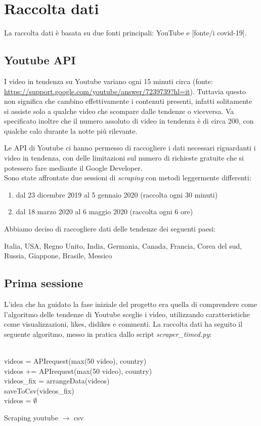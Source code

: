 \section*{Raccolta dati}
La raccolta dati è basata su due fonti principali: YouTube e [fonte/i covid-19].

\subsection*{Youtube API}
I video in tendenza su Youtube variano ogni 15 minuti circa (fonte: \url{https://support.google.com/youtube/answer/7239739?hl=it}). Tuttavia questo non significa che cambino effettivamente i contenuti presenti, infatti solitamente si assiste solo a qualche video che scompare dalle tendenze o viceversa. Va specificato inoltre che il numero assoluto di video in tendenza è di circa 200, con qualche calo durante la notte più rilevante.

Le API di Youtube ci hanno permesso di raccogliere i dati necessari riguardanti i video in tendenza, con delle limitazioni sul numero di richieste gratuite che si potessero fare mediante il Google Developer.
\\
Sono state affrontate due sessioni di \textit{scraping} con metodi leggermente differenti:
\begin{enumerate}
	\item dal 23 dicembre 2019 al 5 gennaio 2020 (raccolta ogni 30 minuti)
	\item dal 18 marzo 2020 al 6 maggio 2020 (raccolta ogni 6 ore)
\end{enumerate}
Abbiamo deciso di raccogliere dati delle tendenze dei seguenti paesi:

Italia, USA, Regno Unito, India, Germania, Canada, Francia, Corea del sud, Russia, Giappone, Brasile, Messico\\

\subsection*{Prima sessione}
L'idea che ha guidato la fase iniziale del progetto era quella di comprendere come l'algoritmo delle tendenze di Youtube sceglie i video, utilizzando caratteristiche come visualizzazioni, likes, dislikes e commenti. La raccolta dati ha seguito il seguente algoritmo, messo in pratica dallo script \textit{scraper\_timed.py}:\\
\\
\begin{algorithm}[H]
	\nl {} {
	\nl {}
	{
		\nl videos = APIrequest(max(50 video), country)\\
		\nl {}
		{
			\nl videos += APIrequest(max(50 video), country) \\
		}
		\nl videos\_fix = arrangeData(videos)\\ 
		\nl saveToCsv(videos\_fix) \\
		\nl videos = $\emptyset$
	}
	}
	\caption{Scraping youtube $\rightarrow$ csv}
\end{algorithm}


